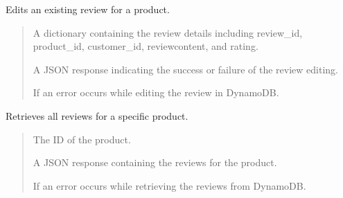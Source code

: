 \documentclass[letterpaper,10pt,english]{sphinxmanual}
\begin{document}

\begin{fulllineitems}
\label{\detokenize{routes_reviews:routes_reviews.route_edit_review}}
\pysigstartsignatures
{}
\pysigstopsignatures
\sphinxAtStartPar
Edits an existing review for a product.
\begin{quote}\begin{description}
\sphinxAtStartPar
{} \textendash{} A dictionary containing the review details including review\_id, product\_id, customer\_id, reviewcontent, and rating.

\sphinxAtStartPar
A JSON response indicating the success or failure of the review editing.

\sphinxAtStartPar
{} \textendash{} If an error occurs while editing the review in DynamoDB.

\end{description}\end{quote}

\end{fulllineitems}


\begin{fulllineitems}
\label{\detokenize{routes_reviews:routes_reviews.route_get_batch}}
\pysigstartsignatures
{}
\pysigstopsignatures
\sphinxAtStartPar
Retrieves all reviews for a specific product.
\begin{quote}\begin{description}
\sphinxAtStartPar
{} \textendash{} The ID of the product.

\sphinxAtStartPar
A JSON response containing the reviews for the product.

\sphinxAtStartPar
{} \textendash{} If an error occurs while retrieving the reviews from DynamoDB.

\end{description}\end{quote}

\end{fulllineitems}
\end{document}
